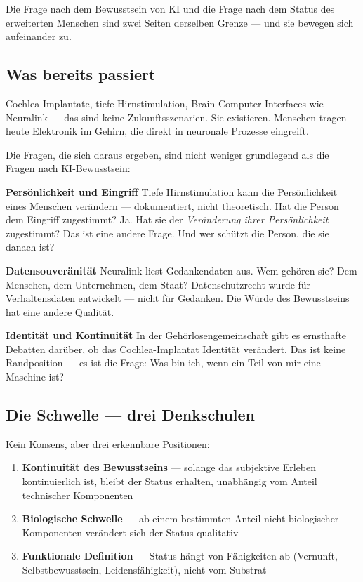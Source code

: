 \documentclass[acmcp, nonacm]{acmart}
\begin{document}
Die Frage nach dem Bewusstsein von KI und die Frage nach dem Status des erweiterten Menschen sind zwei Seiten derselben Grenze --- und sie bewegen sich aufeinander zu.

\subsection{Was bereits passiert}

Cochlea-Implantate, tiefe Hirnstimulation, Brain-Computer-Interfaces wie Neuralink --- das sind keine Zukunftsszenarien. Sie existieren. Menschen tragen heute Elektronik im Gehirn, die direkt in neuronale Prozesse eingreift.

Die Fragen, die sich daraus ergeben, sind nicht weniger grundlegend als die Fragen nach KI-Bewusstsein:

\noindent\textbf{Persönlichkeit und Eingriff}
Tiefe Hirnstimulation kann die Persönlichkeit eines Menschen verändern --- dokumentiert, nicht theoretisch. Hat die Person dem Eingriff zugestimmt? Ja. Hat sie der \emph{Veränderung ihrer Persönlichkeit} zugestimmt? Das ist eine andere Frage. Und wer schützt die Person, die sie danach ist?

\noindent\textbf{Datensouveränität}
Neuralink liest Gedankendaten aus. Wem gehören sie? Dem Menschen, dem Unternehmen, dem Staat? Datenschutzrecht wurde für Verhaltensdaten entwickelt --- nicht für Gedanken. Die Würde des Bewusstseins hat eine andere Qualität.

\noindent\textbf{Identität und Kontinuität}
In der Gehörlosengemeinschaft gibt es ernsthafte Debatten darüber, ob das Cochlea-Implantat Identität verändert. Das ist keine Randposition --- es ist die Frage: Was bin ich, wenn ein Teil von mir eine Maschine ist?

\subsection{Die Schwelle --- drei Denkschulen}

Kein Konsens, aber drei erkennbare Positionen:

\begin{enumerate}
\item \textbf{Kontinuität des Bewusstseins} --- solange das subjektive Erleben kontinuierlich ist, bleibt der Status erhalten, unabhängig vom Anteil technischer Komponenten
\item \textbf{Biologische Schwelle} --- ab einem bestimmten Anteil nicht-biologischer Komponenten verändert sich der Status qualitativ
\item \textbf{Funktionale Definition} --- Status hängt von Fähigkeiten ab (Vernunft, Selbstbewusstsein, Leidensfähigkeit), nicht vom Substrat
\end{enumerate}
\end{document}
